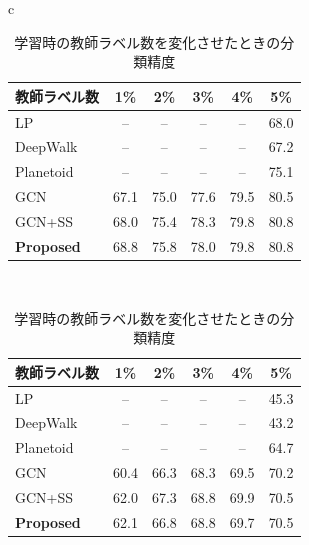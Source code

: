 \begin{table}[h]
  \begin{center}
  \caption{学習時の教師ラベル数を変化させたときの分類精度}
    \begin{tabular}{c}

      \begin{minipage}{0.7\hsize}
        \begin{center}
	\label{cora_result}
        \begin{tabular}{l|ccccc} \hline
    教師ラベル数 &  1\% & 2\% & 3\% & 4\% & 5\%  \\ \hline
    LP & -- & -- & -- & -- & 68.0 \\
    DeepWalk & -- & -- & -- & -- & 67.2 \\
    Planetoid & -- & -- & -- & -- & 75.1 \\ \hline \hline
    GCN & 67.1 & 75.0 & 77.6 & 79.5 & 80.5 \\
    GCN+SS & 68.0 & 75.4 & 78.3 & 79.8 & 80.8 \\
    {\bf Proposed} & 68.8 & 75.8 & 78.0 & 79.8 & 80.8 \\ \hline
  \end{tabular}
        \end{center}
             \vspace{1cm}
      \end{minipage}\\
      
 
      
      \begin{minipage}{0.7\hsize}
        \begin{center}
\label{citeseer_result}
  \begin{tabular}{l|ccccc} \hline
    教師ラベル数 &  1\% & 2\% & 3\% & 4\% & 5\%  \\ \hline
     LP & -- & -- & -- & -- & 45.3 \\
    DeepWalk & -- & -- & -- & -- & 43.2 \\
    Planetoid & -- & -- & -- & -- & 64.7 \\ \hline \hline
    GCN & 60.4 & 66.3 & 68.3 & 69.5 & 70.2 \\
    GCN+SS & 62.0 & 67.3 & 68.8 & 69.9 & 70.5 \\
    {\bf Proposed} & 62.1 & 66.8 & 68.8 & 69.7 & 70.5 \\ \hline
  \end{tabular}
        \end{center}
          \vspace{1cm}
      \end{minipage}\\
      

\end{tabular}
\end{center}
\end{table}
